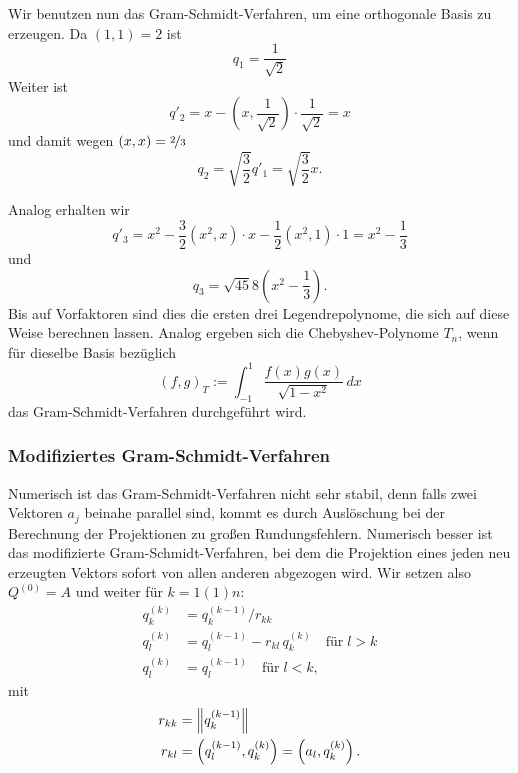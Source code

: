 Wir benutzen nun das Gram-Schmidt-Verfahren, um eine orthogonale Basis
zu erzeugen. Da  $(1, 1) = 2$ ist
\begin{equation}
  q_1 = \frac{1}{\sqrt{2}}
\end{equation}
Weiter ist
\begin{equation}
  q'_2 = x - \left(x, \frac{1}{\sqrt{2}}\right) \cdot \frac{1}{\sqrt{2}} = 
  x
\end{equation}
und damit wegen $(x,x) = \nicefrac{2}{3}$
\begin{equation}
  q_2 = \sqrt{\frac{3}{2}} q'_1 =
  \sqrt{\frac{3}{2}} x.
\end{equation}

Analog erhalten wir
\begin{equation}
  q'_3 = x^2 - \frac{3}{2} (x^2, x) \cdot x - \frac{1}{2}(x^2, 1) \cdot 1 = 
  x^2  - \frac{1}{3}
\end{equation}
und
\begin{equation}
  q_3 = \sqrt{45}{8}\left(x^2  - \frac{1}{3}\right).
\end{equation}
Bis auf Vorfaktoren sind dies die ersten drei Legendrepolynome, die
sich auf diese Weise berechnen lassen. Analog ergeben sich die
Chebyshev-Polynome $T_n$, wenn für dieselbe Basis bezüglich
\begin{equation}
  (f, g)_T := \int_{-1}^1 \frac{f(x)g(x)}{\sqrt{1-x^2}}\, dx
\end{equation}
das Gram-Schmidt-Verfahren durchgeführt wird.

\subsubsection{Modifiziertes Gram-Schmidt-Verfahren}

Numerisch ist das Gram-Schmidt-Verfahren nicht sehr stabil, denn falls
zwei Vektoren $a_j$ beinahe parallel sind, kommt es durch Auslöschung
bei der Berechnung der Projektionen zu großen
Rundungsfehlern. Numerisch besser ist das modifizierte
Gram-Schmidt-Verfahren, bei dem die Projektion eines jeden neu
erzeugten Vektors sofort von allen anderen abgezogen wird. Wir setzen
also $Q^{(0)}=A$ und weiter für $k=1(1)n$:
\begin{align}
  \label{eq:modgs}
  q_k^{(k)} &= q_k^{(k-1)}/r_{kk}\nonumber\\
  q_l^{(k)} &= q_l^{(k-1)} - r_{kl}\,q_k^{(k)}\quad\text{für}\; l>k\\
  q_l^{(k)} &= q_l^{(k-1)} \quad\text{für}\; l<k,\nonumber
\end{align}
mit
\begin{align}
  r_{kk} &= \left\lVert{q_k^{(k-1)}}\right\rVert\nonumber\\
  r_{kl} &= \left(q_l^{(k-1)}, q_k^{(k)}\right) =  \left(a_l, q_k^{(k)}\right).
\end{align}

